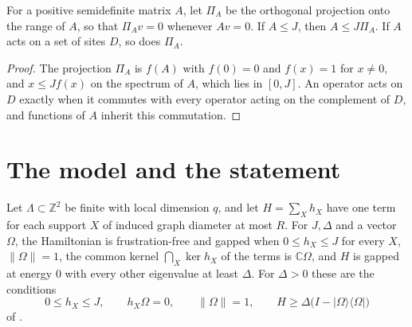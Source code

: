 \begin{lemma}
    \label{thm:frustration_free_area_law_range_projection}
    \leanok
    For a positive semidefinite matrix $A$, let $\Pi_A$ be the orthogonal
    projection onto the range of $A$, so that $\Pi_Av=0$ whenever $Av=0$. If
    $A\le J$, then $A\le J\Pi_A$. If $A$ acts on a set of sites $D$, so does
    $\Pi_A$.
\end{lemma}

\begin{proof}\leanok
    The projection $\Pi_A$ is $f(A)$ with $f(0)=0$ and $f(x)=1$ for $x\ne0$,
    and $x\le Jf(x)$ on the spectrum of $A$, which lies in $[0,J]$. An operator
    acts on $D$ exactly when it commutes with every operator acting on the
    complement of $D$, and functions of $A$ inherit this commutation.
\end{proof}

\section{The model and the statement}
\label{sec:frustration_free_area_law_model}

\begin{definition}
    \label{def:frustration_free_area_law_model}
    \leanok
    Let $\Lambda\subset\mathbb Z^2$ be finite with local dimension $q$, and let
    $H=\sum_Xh_X$ have one term for each support $X$ of induced graph
    diameter at most $R$. For $J,\Delta$ and a vector $\Omega$, the
    Hamiltonian is frustration-free and gapped when $0\le h_X\le J$ for every
    $X$, $\|\Omega\|=1$, the common kernel $\bigcap_X\ker h_X$ of the terms
    is $\mathbb C\Omega$, and $H$ is gapped at energy $0$ with every other
    eigenvalue at least $\Delta$. For $\Delta>0$ these are
    the conditions
    \[
        0\le h_X\le J,\qquad h_X\Omega=0,\qquad\|\Omega\|=1,\qquad
        H\ge\Delta\bigl(I-|\Omega\rangle\langle\Omega|\bigr)
    \]
    of \cite[eq.~(model)]{TNLean2026FrustrationFreeNote}.
\end{definition}

